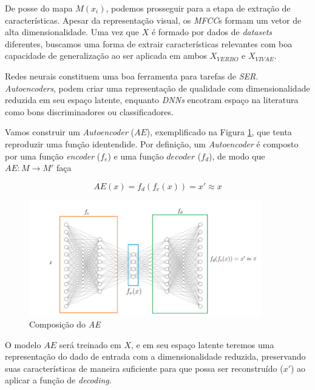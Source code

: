 De posse do mapa $M(x_i)$, podemos prosseguir para a etapa de extração de características. Apesar da representação visual, os \textit{MFCC}s formam um vetor de alta dimensionalidade. Uma vez que $X$ é formado por dados de \textit{datasets} diferentes, buscamos uma forma de extrair características relevantes com boa capacidade de generalização ao ser aplicada em ambos $X_{VERBO}$ e $X_{VIVAE}$.

Redes neurais constituem uma boa ferramenta para tarefas de \textit{SER}. \textit{Autoencoders}, podem criar uma representação de qualidade com dimensionalidade reduzida em seu espaço latente, enquanto \textit{DNNs} encotram espaço na literatura como bons discriminadores ou classificadores.

Vamos construir um \textit{Autoencoder} ($AE$), exemplificado na Figura \ref{fig:composicaoae}, que tenta reproduzir uma função identendide. Por definição, um \textit{Autoencoder} é composto por uma função \textit{encoder} ($f_e$) e uma função $decoder$ ($f_d$), de modo que $AE: M \rightarrow M'$ faça

\begin{equation}
    AE(x) = f_d(f_e(x)) = x' \approx x
\end{equation}

\begin{figure}[!h]
    \centering
    \includegraphics[width=0.9\textwidth]{imagens/p-autoencoder.png}
    \caption{\label{fig:composicaoae}Composição do \textit{AE}}
\end{figure}

O modelo $AE$ será treinado em $X$, e em seu espaço latente teremos uma representação do dado de entrada com a dimensionalidade reduzida, preservando suas características de maneira suficiente para que possa ser reconstruído ($x'$) ao aplicar a função de \textit{decoding}.

